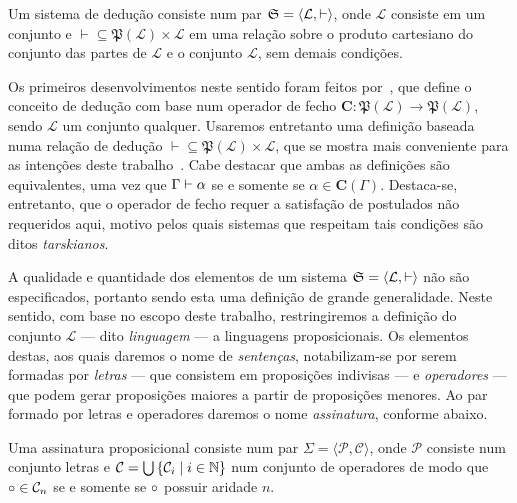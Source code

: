 \vspace{.5\baselineskip}
\begin{tcolorbox}[enhanced jigsaw, breakable, sharp corners, colframe=black, colback=white, boxrule=0.5pt, left=1.5mm, right=1.5mm, top=1.5mm, bottom=1.5mm]
\begin{definition}[Sistema]
    Um sistema de dedução consiste num par $\mathfrak{S} = \langle\mathcal{L}, \vdash\rangle$, onde $\mathcal{L}$ consiste em um conjunto e ${\vdash}\subseteq\mathfrak{P}(\mathcal{L})\times\mathcal{L}$ em uma relação sobre o produto cartesiano do conjunto das partes de $\mathcal{L}$ e o conjunto $\mathcal{L}$, sem demais condições.
\end{definition}
\end{tcolorbox}

\vspace{.5\baselineskip}
Os primeiros desenvolvimentos neste sentido foram feitos por~\cite{Tarski.1983}, que define o conceito de dedução com base num operador de fecho $\mathbf{C}\mathrel{:}\mathfrak{P}(\mathcal{L})\to\mathfrak{P}(\mathcal{L})$, sendo $\mathcal{L}$ um conjunto qualquer.
Usaremos entretanto uma definição baseada numa relação de dedução ${\vdash}\subseteq\mathfrak{P}(\mathcal{L})\times\mathcal{L}$, que se mostra mais conveniente para as intenções deste trabalho~\citep{Coniglio.2005}.
Cabe destacar que ambas as definições são equivalentes, uma vez que $\Gamma\mathrel{\vdash}\alpha$ se e somente se $\alpha\in\mathbf{C}(\Gamma)$.
Destaca-se, entretanto, que o operador de fecho requer a satisfação de postulados não requeridos aqui, motivo pelos quais sistemas que respeitam tais condições são ditos \emph{tarskianos}.

\vspace{.5\baselineskip}
A qualidade e quantidade dos elementos de um sistema $\mathfrak{S}=\langle\mathcal{L}, \vdash\rangle$ não são especificados, portanto sendo esta uma definição de grande generalidade.
Neste sentido, com base no escopo deste trabalho, restringiremos a definição do conjunto $\mathcal{L}$ --- dito \emph{linguagem} --- a linguagens proposicionais.
Os elementos destas, aos quais daremos o nome de \emph{sentenças}, notabilizam-se por serem formadas por \emph{letras} --- que consistem em proposições indivisas --- e \emph{operadores} --- que podem gerar proposições maiores a partir de proposições menores.
Ao par formado por letras e operadores daremos o nome \emph{assinatura}, conforme abaixo.

\vspace{.5\baselineskip}
\begin{tcolorbox}[enhanced jigsaw, breakable, sharp corners, colframe=black, colback=white, boxrule=0.5pt, left=1.5mm, right=1.5mm, top=1.5mm, bottom=1.5mm]
\begin{definition}[Assinatura]
    Uma assinatura proposicional consiste num par $\Sigma=\langle\mathcal{P},\mathcal{C}\rangle$, onde $\mathcal{P}$ consiste num conjunto letras e $\mathcal{C}=\bigcup\left\{\mathcal{C}_i\mid i\in\mathbb{N}\right\}$ num conjunto de operadores de modo que $\mathalpha{\circ}\in\mathcal{C}_n$ se e somente se $\mathalpha{\circ}$ possuir aridade $n$.
\end{definition}
\end{tcolorbox}

